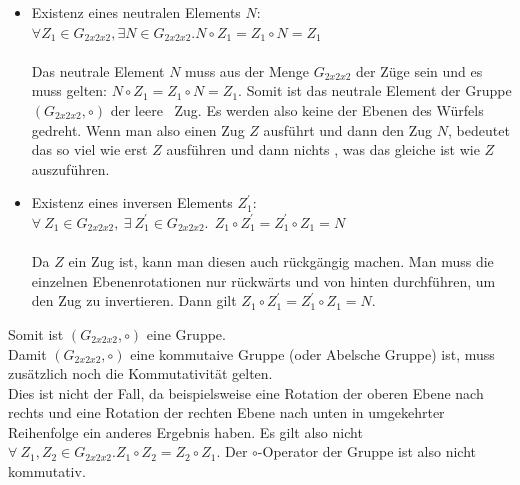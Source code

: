 \documentclass[12pt,a4paper, usenames, dvipsnames]{scrartcl}
\begin{document}
\begin{itemize}
\item Existenz eines neutralen Elements $N$:  \\
$\forall Z_1 \in G_{2x2x2}, \exists N \in G_{2x2x2}.N \circ Z_1 = Z_1 \circ N = Z_1$ \\
\\
Das neutrale Element $N$ muss aus der Menge $G_{2x2x2}$ der Züge sein und es muss gelten: $N \circ Z_1 = Z_1 \circ N = Z_1$. Somit ist das neutrale Element der Gruppe $(G_{2x2x2}, \circ)$ der \glqq leere \grqq \ Zug. Es werden also keine der Ebenen des Würfels gedreht. Wenn man also einen Zug $Z$ ausführt und dann den Zug $N$, bedeutet das so viel wie \glqq erst $Z$ ausführen und dann nichts \grqq , was das gleiche ist wie $Z$ auszuführen.


\item Existenz eines inversen Elements $Z_1^\prime$: \\ 
$\forall \  Z_1 \in G_{2x2x2},\ \exists \  Z_1^\prime \in G_{2x2x2}.  \ \ Z_1 \circ Z_1^\prime = Z_1^\prime \circ Z_1 = N$  \\
\\
Da $Z$ ein Zug ist, kann man diesen auch rückgängig machen. Man muss die einzelnen Ebenenrotationen nur rückwärts und von hinten durchführen, um den Zug zu invertieren. Dann gilt $Z_1 \circ Z_1^\prime = Z_1^\prime \circ Z_1 = N$.
\end{itemize}
Somit ist $(G_{2x2x2}, \circ)$ eine Gruppe. \\
Damit $(G_{2x2x2}, \circ)$ eine kommutaive Gruppe (oder Abelsche Gruppe) ist, muss zusätzlich noch die Kommutativität gelten. \\
Dies ist nicht der Fall, da beispielsweise eine Rotation der oberen Ebene nach rechts und eine Rotation der rechten Ebene nach unten in umgekehrter Reihenfolge ein anderes Ergebnis haben. Es gilt also nicht $\forall \  Z_1, Z_2 \in G_{2x2x2}. Z_1 \circ Z_2 = Z_2 \circ Z_1$. Der $\circ$-Operator der Gruppe ist also nicht kommutativ. \\
\\










\end{document}
